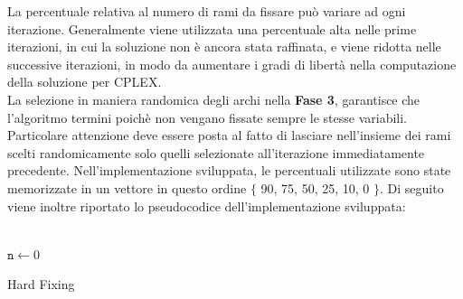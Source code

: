 La percentuale relativa al numero di rami da fissare può variare ad ogni iterazione. Generalmente viene utilizzata una percentuale alta nelle prime iterazioni, in cui la soluzione non è ancora stata raffinata, e viene ridotta nelle successive iterazioni, in modo da aumentare i gradi di libertà nella computazione della soluzione per CPLEX.\\
La selezione in maniera randomica degli archi nella \textbf{Fase 3}, garantisce che l'algoritmo termini poichè non vengano fissate sempre le stesse variabili. 
Particolare attenzione deve essere posta al fatto di lasciare nell'insieme dei rami scelti randomicamente solo quelli selezionate all'iterazione immediatamente precedente. Nell'implementazione sviluppata, le percentuali utilizzate sono state memorizzate in un vettore in questo ordine $\lbrace$ 90, 75, 50, 25, 10, 0 $\rbrace$.
Di seguito viene inoltre riportato lo pseudocodice dell'implementazione sviluppata:\\\\
\begin{algorithm}[H]
\DontPrintSemicolon
{}
\BlankLine
$\mathtt{n \gets}0$\;
\BlankLine
{}
\caption{Hard Fixing}
\end{algorithm}

